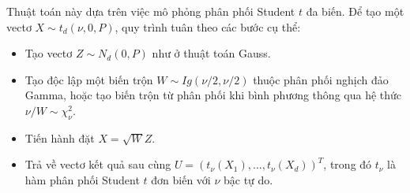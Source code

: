Thuật toán này dựa trên việc mô phỏng phân phối Student $t$ đa biến. Để tạo một vectơ $X \sim t_d(\nu, 0, P)$, quy trình tuân theo các bước cụ thể:
\begin{itemize}
    \item Tạo vectơ $Z \sim N_d(0, P)$ như ở thuật toán Gauss.
    \item Tạo độc lập một biến trộn $W \sim Ig(\nu/2, \nu/2)$ thuộc phân phối nghịch đảo Gamma, hoặc tạo biến trộn từ phân phối khi bình phương thông qua hệ thức $\nu/W \sim \chi_\nu^2$.
    \item Tiến hành đặt $X = \sqrt{W}Z$.
    \item Trả về vectơ kết quả sau cùng $U = (t_\nu(X_1), \dots, t_\nu(X_d))^T$, trong đó $t_\nu$ là hàm phân phối Student $t$ đơn biến với $\nu$ bậc tự do.
\end{itemize}